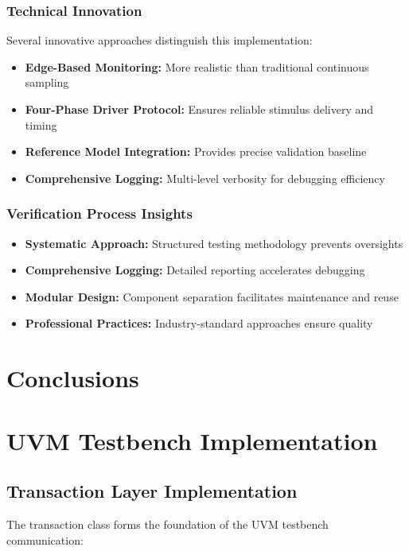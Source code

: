 \documentclass[12pt,a4paper]{article}
\begin{document}
\subsubsection{Technical Innovation}
Several innovative approaches distinguish this implementation:
\begin{itemize}
    \item \textbf{Edge-Based Monitoring:} More realistic than traditional continuous sampling
    \item \textbf{Four-Phase Driver Protocol:} Ensures reliable stimulus delivery and timing
    \item \textbf{Reference Model Integration:} Provides precise validation baseline
    \item \textbf{Comprehensive Logging:} Multi-level verbosity for debugging efficiency
\end{itemize}


\subsubsection{Verification Process Insights}
\begin{itemize}
    \item \textbf{Systematic Approach:} Structured testing methodology prevents oversights
    \item \textbf{Comprehensive Logging:} Detailed reporting accelerates debugging
    \item \textbf{Modular Design:} Component separation facilitates maintenance and reuse
    \item \textbf{Professional Practices:} Industry-standard approaches ensure quality
\end{itemize}

\section{Conclusions}



\section{UVM Testbench Implementation}
\subsection{Transaction Layer Implementation}
The transaction class forms the foundation of the UVM testbench communication:
\end{document}

